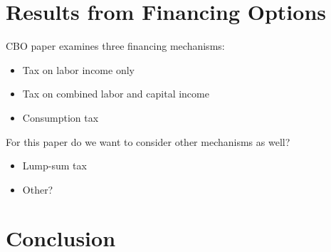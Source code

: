 \documentclass[letterpaper,12pt]{article}
\numberwithin{equation}{section}
\numberwithin{figure}{section}
\numberwithin{table}{section}
\begin{document}
\begin{spacing}{1.5}
\section{Results from Financing Options} \label{sec_results}

	CBO paper examines three financing mechanisms:

	\begin{itemize}
		\item Tax on labor income only
		\item Tax on combined labor and capital income
		\item Consumption tax
	\end{itemize}

	For this paper do we want to consider other mechanisms as well?
	\begin{itemize}
		\item Lump-sum tax
		\item Other?
	\end{itemize}

\section{Conclusion} \label{sec_concl}

	

\clearpage



\end{spacing}
\newpage
\nocite{*}

\end{document}
